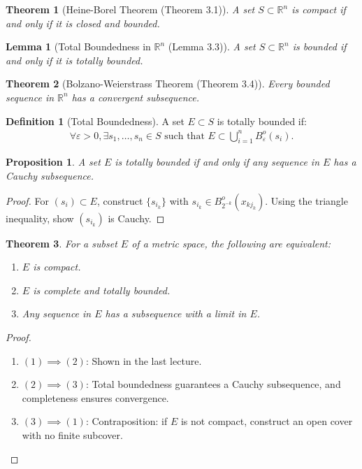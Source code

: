 \documentclass[7pt]{article}
\theoremstyle{definition}
\newtheorem{definition}{Definition}
\theoremstyle{plain}
\newtheorem{theorem}{Theorem}
\newtheorem{proposition}{Proposition}
\newtheorem{lemma}{Lemma}
\begin{document}
\begin{theorem}[Heine-Borel Theorem (Theorem 3.1)]
A set $ S \subset \mathbb{R}^n $ is compact if and only if it is closed and bounded.
\end{theorem}

\begin{lemma}[Total Boundedness in $ \mathbb{R}^n $ (Lemma 3.3)]
A set $ S \subset \mathbb{R}^n $ is bounded if and only if it is totally bounded.
\end{lemma}

\begin{theorem}[Bolzano-Weierstrass Theorem (Theorem 3.4)]
Every bounded sequence in $ \mathbb{R}^n $ has a convergent subsequence.
\end{theorem}

\begin{definition}[Total Boundedness]
A set $ E \subset S $ is totally bounded if:
\begin{align}
\forall \varepsilon > 0, \exists s_1, \ldots, s_n \in S \text{ such that } E \subset \bigcup_{i=1}^n B_\varepsilon^o(s_i).
\end{align}
\end{definition}

\begin{proposition}
A set $ E $ is totally bounded if and only if any sequence in $ E $ has a Cauchy subsequence.
\end{proposition}

\begin{proof}
For $ (s_i) \subset E $, construct $ \{s_{i_k}\} $ with $ s_{i_k} \in B_{2^{-k}}^o(x_{kj_k}) $. Using the triangle inequality, show $ (s_{i_k}) $ is Cauchy.
\end{proof}

\begin{theorem}
For a subset $ E $ of a metric space, the following are equivalent:
\begin{enumerate}
    \item $ E $ is compact.
    \item $ E $ is complete and totally bounded.
    \item Any sequence in $ E $ has a subsequence with a limit in $ E $.
\end{enumerate}
\end{theorem}

\begin{proof}

\begin{enumerate}
    \item $ (1) \implies (2) $: Shown in the last lecture.
    \item $ (2) \implies (3) $: Total boundedness guarantees a Cauchy subsequence, and completeness ensures convergence.
    \item $ (3) \implies (1) $: Contraposition: if $ E $ is not compact, construct an open cover with no finite subcover.
\end{enumerate}
\end{proof}
\end{document}
